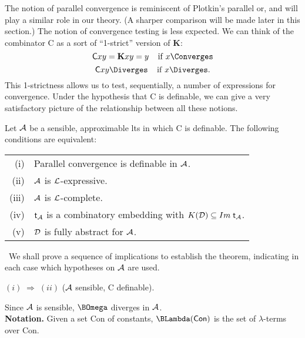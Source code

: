 The notion of parallel convergence is reminiscent of Plotkin's parallel or, 
and will play a similar role in our theory. 
(A sharper comparison will be made later in this section.) 
The notion of convergence testing is less expected. 
We can think of the combinator {\sf C} as a sort of ``1-strict'' version of {\bf K}:
\[ {\sf C} x y = {\bf K} x y = y \;\;\;\; {\rm if} \; x {\Converges} \]
\[ {\sf C} x y {\Diverges} \;\;\;\; {\rm if} \; x {\Diverges} . \]
This 1-strictness allows us to test, sequentially, a number of expressions 
for convergence. 
Under the hypothesis that {\sf C} is definable, we can give a very satisfactory picture of the relationship between all these notions.
\begin{theorem}
Let $\cal A$ be a sensible, approximable lts in which {\sf C} is definable. 
The following conditions are equivalent:
\begin{center}
\begin{tabular}{rl}
(i) &  Parallel convergence is definable in $\cal A$. \\ 
(ii) &  $\cal A$ is $\cal L$-expressive. \\
(iii) &  $\cal A$ is $\cal L$-complete. \\
(iv)  & ${\sf t}_{\cal A}$ is a combinatory embedding with ${\sl K}({\cal D}) \subseteq {\sl Im} \; {\sf t}_{\cal A}$. \\ 
(v)  & $\cal D$ is fully abstract for $\cal A$. 
\end{tabular}
\end{center}
\end{theorem}

\proof\ We shall prove a sequence of implications to establish the theorem, indicating in each case which hypotheses on $\cal A$ are used.

\noindent $(i) \; \Longrightarrow \; (ii)$ ($\cal A$ sensible, {\sf C} definable).

Since $\cal A$ is sensible, $\BOmega$ diverges in $\cal A$.
\\
{\bf Notation.} Given a set {\sf Con} of constants, $\BLambda ({\sf Con})$ is the set of $\lambda$-terms over Con.

